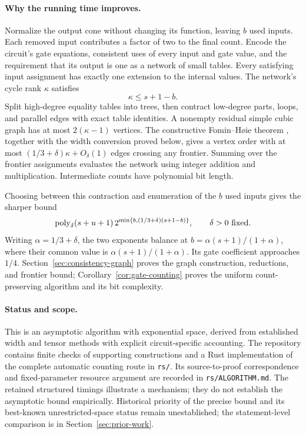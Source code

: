 \paragraph{Why the running time improves.}
Normalize the output cone without changing its function, leaving $b$
used inputs. Each removed input contributes a factor of two to the
final count. Encode the circuit's gate equations, consistent uses of
every input and gate value, and the requirement that its output is one
as a network of small tables. Every satisfying input assignment has
exactly one extension to the internal values. The network's cycle rank
$\kappa$ satisfies
\[
 \kappa\le s+1-b.
\]
Split high-degree equality tables into trees, then contract low-degree
parts, loops, and parallel edges with exact table identities. A
nonempty residual simple cubic graph has at most $2(\kappa-1)$
vertices. The constructive Fomin--H\o ie theorem
\citep{FominHoie2006}, together with the width conversion proved below,
gives a vertex order with at most $(1/3+\delta)\kappa+O_\delta(1)$
edges crossing any frontier. Summing over the frontier assignments
evaluates the network using integer addition and multiplication.
Intermediate counts have polynomial bit length.

Choosing between this contraction and enumeration of the $b$ used
inputs gives the sharper bound
\begin{equation}\label{eq:headline-sensitive}
 \operatorname{poly}_\delta(s+u+1)\,
 2^{\min\{b,(1/3+\delta)(s+1-b)\}},
 \qquad \delta>0\text{ fixed}.
\end{equation}
Writing $\alpha=1/3+\delta$, the two exponents balance at
$b=\alpha(s+1)/(1+\alpha)$, where their common value is
$\alpha(s+1)/(1+\alpha)$. Its gate coefficient approaches $1/4$.
Section~\ref{sec:consistency-graph} proves the graph construction,
reductions, and frontier bound; Corollary~\ref{cor:gate-counting}
proves the uniform count-preserving algorithm and its bit complexity.

\paragraph{Status and scope.}
This is an asymptotic algorithm with exponential space, derived from
established width and tensor methods with explicit circuit-specific
accounting. The repository contains finite checks of supporting
constructions and a Rust implementation of the complete automatic
counting route in \texttt{rs/}. Its source-to-proof correspondence and
fixed-parameter resource argument are recorded in \texttt{rs/ALGORITHM.md}.
The retained structured timings illustrate a mechanism; they do not
establish the asymptotic bound empirically. Historical priority of the precise bound and its
best-known unrestricted-space status remain unestablished; the
statement-level comparison is in Section~\ref{sec:prior-work}.

